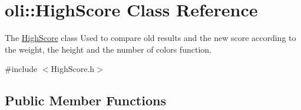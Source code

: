 \hypertarget{classoli_1_1_high_score}{}\section{oli\+:\+:High\+Score Class Reference}
\label{classoli_1_1_high_score}


The \hyperlink{classoli_1_1_high_score}{High\+Score} class Used to compare old results and the new score according to the weight, the height and the number of colors function.  




{\ttfamily \#include $<$High\+Score.\+h$>$}

\subsection*{Public Member Functions}
